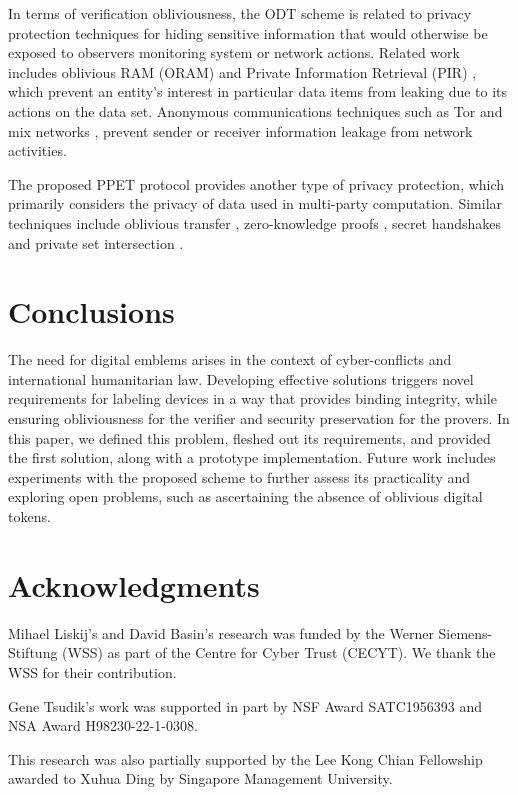 \documentclass[letterpaper,twocolumn,10pt]{article}
\begin{document}
In terms of verification obliviousness, the ODT scheme is related to privacy protection techniques for hiding
sensitive information that would otherwise be exposed to observers monitoring system or network actions.
Related work includes oblivious RAM (ORAM) \cite{ORAM} and Private Information Retrieval (PIR) \cite{pir},
which prevent an entity's interest in particular data items from leaking due to its actions on the data set.
Anonymous communications techniques such as Tor \cite{TOR} and mix networks \cite{jakobsson2001optimally},
prevent sender or receiver information leakage from network activities.

The proposed PPET protocol provides another type of privacy protection, which primarily considers the privacy of
data used in multi-party computation. Similar techniques include oblivious transfer \cite{OT}, zero-knowledge proofs \cite{goldreich1994definitions}, secret handshakes \cite{BDSSS03} and private set intersection \cite{PSI,PSZ18,PSI99,PSI_tsudik}.

\section{Conclusions}
\label{sec:conc}
The need for digital emblems arises in the context of cyber-conflicts and international
humanitarian law. Developing effective solutions triggers novel requirements for labeling devices
in a way that provides binding integrity, while ensuring obliviousness for the verifier and
security preservation for the provers. In this paper, we defined this problem, fleshed out
its requirements, and provided the first solution, along with a prototype implementation.
Future work includes experiments with the proposed scheme to further assess its practicality and
exploring open problems, such as  ascertaining the absence of oblivious digital tokens.

\section*{Acknowledgments}
Mihael Liskij's and David Basin's research was funded by the Werner Siemens-Stiftung (WSS) as part of the Centre for Cyber Trust (CECYT). We thank the WSS for their contribution.

Gene Tsudik's work was supported in part by NSF Award SATC1956393 and NSA Award H98230-22-1-0308.

This research was also partially supported by the Lee Kong Chian Fellowship awarded to Xuhua Ding by Singapore Management University.
\end{document}
